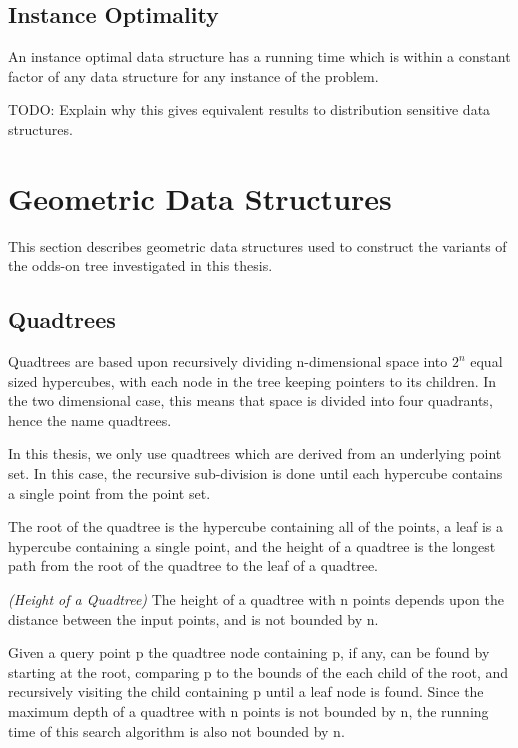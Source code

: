 \documentclass[mcs]{scsthesis}
\begin{document}
\subsection{Instance Optimality}

An instance optimal data structure \cite{chan} has a running time which is
within a constant factor of any data structure for any instance of the problem.

TODO: Explain why this gives equivalent results to distribution sensitive data
structures.


\section{Geometric Data Structures}

This section describes geometric data structures used to construct the variants
of the odds-on tree investigated in this thesis.

\subsection{Quadtrees}

Quadtrees are based upon recursively dividing n-dimensional space into \(2^n\)
equal sized hypercubes, with each node in the tree keeping pointers to its
children.  In the two dimensional case, this means that space is divided into
four quadrants, hence the name quadtrees.  

In this thesis, we only use quadtrees which are derived from an underlying point
set.  In this case, the recursive sub-division is done until each hypercube
contains a single point from the point set.

The root of the quadtree is the hypercube containing all of the points, a leaf
is a hypercube containing a single point, and the height of a quadtree
is the longest path from the root of the quadtree to the leaf of a quadtree.

\begin{thm} \emph{(Height of a Quadtree)}
The height of a quadtree with n points depends upon the distance between
the input points, and is not bounded by n.
\end{thm}

Given a query point p the quadtree node containing p, if any, can be found by
starting at the root, comparing p to the bounds of the each child of the root,
and recursively visiting the child containing p until a leaf node is found.  
Since the maximum depth of a quadtree with n points is not bounded by n, the
running time of this search algorithm is also not bounded by n. 
\end{document}
